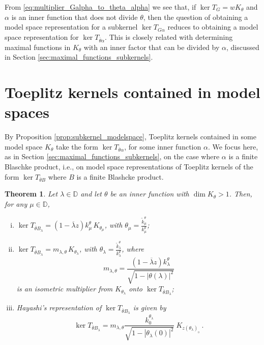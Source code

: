 \documentclass{article}
\numberwithin{equation}{section}
\theoremstyle{plain}
\newtheorem{thm}{Theorem}[section]
\newcommand{\DD}{\ensuremath{\mathbb{D}}}
\newcommand{\ol}[1]{\ensuremath{\overline{#1}}}
\begin{document}
From \eqref{eq:multiplier_Galpha_to_theta_alpha} we see that, if $\ker T_G = w K_\theta$ and $\alpha$ is an inner function that does not divide $\theta$, then the question of obtaining a model space representation for a subkernel $\ker T_{G\alpha}$ reduces to obtaining a model space representation for $\ker T_{\ol\theta\alpha}$.
This is closely related with determining maximal functions in $K_\theta$ with an inner factor that can be divided by $\alpha$, discussed in Section \ref{sec:maximal_functions_subkernels}.




\section{Toeplitz kernels contained in model spaces}
\label{sec:Toeplitz_kernels_contained_in_model_spaces}


By Proposition \ref{prop:subkernel_modelspace}, Toeplitz kernels contained in some model space $K_\theta$ take the form $\ker T_{\ol\theta \alpha}$, for some inner function $\alpha$.
We focus here, as in Section \ref{sec:maximal_functions_subkernels}, on the case where $\alpha$ is a finite Blaschke product, i.e., on model space representations of Toeplitz kernels of the form $\ker T_{\ol\theta B}$ where $B$ is a finite Blashcke product.


\begin{thm}
\label{thm:model_space_repres_ker_theta_Blambda}
Let $\lambda\in\DD$ and let $\theta$ be an inner function with $\dim K_\theta >1$.
Then, for any $\mu\in\DD$,
\begin{enumerate}[(i)]
\item $\ker T_{\ol\theta B_\lambda} = (1-\ol\lambda z) k_\mu^\theta \, K_{\theta_\mu}$, with $\theta_\mu = \frac{\tilde k_\mu^\theta}{k_\mu^\theta}$;

\item $\ker T_{\ol\theta B_\lambda} = m_{\lambda,\theta}\, K_{\theta_\lambda}$, with $\theta_\lambda = \frac{\tilde k_\lambda^\theta}{k_\lambda^\theta}$, where
\begin{equation}
m_{\lambda,\theta} = \frac{(1-\ol\lambda z) k_\lambda^\theta}{\sqrt{1-|\theta(\lambda)|^2}}
\end{equation}
is an isometric multiplier from $K_{\theta_\lambda}$ onto $\ker T_{\ol\theta B_\lambda}$;

\item Hayashi's representation of $\ker T_{\ol\theta B_\lambda}$ is given by
\begin{equation}
\ker T_{\ol\theta B_\lambda} = m_{\lambda,\theta} \frac{k_0^{\theta_\lambda}}{\sqrt{1 - |\theta_\lambda(0)|^2}}\ K_{z (\theta_\lambda)_{{}_0}}\ .
\end{equation}
\end{enumerate}
\end{thm} 
\end{document}
